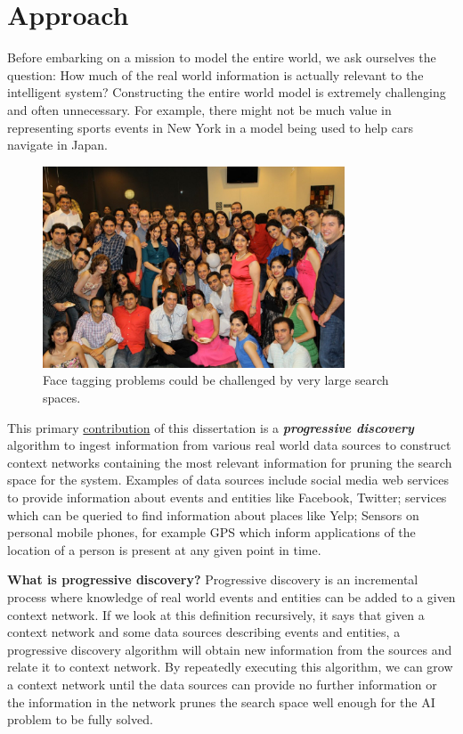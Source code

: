 \section{Approach}
Before embarking on a mission to model the entire world, we ask ourselves the question: How much of the real world information is actually relevant to the intelligent system? Constructing the entire world model is extremely challenging and often unnecessary. For example, there might not be much value in representing sports events in New York in a model being used to help cars navigate in Japan. 

\begin{figure}[t]
\centering
\includegraphics[width=0.8\textwidth]{media/chapter1/setarehetal}
\caption{Face tagging problems could be challenged by very large search spaces.}
\label{fig:india-streets}
\end{figure}

This primary \uline{contribution} of this dissertation is a \textbf{\textit{progressive discovery}} algorithm to ingest information from various real world data sources to construct context networks containing the most relevant information for pruning the search space for the system. Examples of data sources include social media web services to provide information about events and entities like Facebook, Twitter; services which can be queried to find information about places like Yelp; Sensors on personal mobile phones, for example GPS which inform applications of the location of a person is present at any given point in time.

\textbf{What is progressive discovery?} Progressive discovery is an incremental process where knowledge of real world events and entities can be added to a given context network. If we look at this definition recursively, it says that given a context network and some data sources describing events and entities, a progressive discovery algorithm will obtain new information from the sources and relate it to context network. By repeatedly executing this algorithm, we can grow a context network until the data sources can provide no further information or the information in the network prunes the search space well enough for the AI problem to be fully solved.


